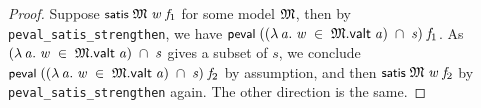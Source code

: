 \documentclass[letterpaper]{article}
\renewcommand{\HOLConst}[1]{{\textsf{\upshape\small #1}}}
\renewcommand{\HOLinline}[1]{\ensuremath{#1}}
\begin{document}
\begin{proof}
Suppose \HOLinline{\HOLConst{satis}\;\HOLFreeVar{\ensuremath{\mathfrak{M}}}\;\HOLFreeVar{w}\;\HOLFreeVar{f\sb{\mathrm{1}}}} for some model \HOLinline{\HOLFreeVar{\ensuremath{\mathfrak{M}}}}, then by \texttt{peval_satis_strengthen}, we have \HOLinline{\HOLConst{peval}\;((\HOLTokenLambda{}\HOLBoundVar{a}.\;\HOLFreeVar{w}\;\HOLSymConst{\HOLTokenIn{}}\;\HOLFreeVar{\ensuremath{\mathfrak{M}}}.\HOLFieldName{valt}\;\HOLBoundVar{a})\;\HOLSymConst{\HOLTokenInter{}}\;\HOLFreeVar{s})\;\HOLFreeVar{f\sb{\mathrm{1}}}}. As \HOLinline{(\HOLTokenLambda{}\HOLBoundVar{a}.\;\HOLFreeVar{w}\;\HOLSymConst{\HOLTokenIn{}}\;\HOLFreeVar{\ensuremath{\mathfrak{M}}}.\HOLFieldName{valt}\;\HOLBoundVar{a})\;\HOLSymConst{\HOLTokenInter{}}\;\HOLFreeVar{s}} gives a subset of $s$, we conclude \HOLinline{\HOLConst{peval}\;((\HOLTokenLambda{}\HOLBoundVar{a}.\;\HOLFreeVar{w}\;\HOLSymConst{\HOLTokenIn{}}\;\HOLFreeVar{\ensuremath{\mathfrak{M}}}.\HOLFieldName{valt}\;\HOLBoundVar{a})\;\HOLSymConst{\HOLTokenInter{}}\;\HOLFreeVar{s})\;\HOLFreeVar{f\sb{\mathrm{2}}}} by assumption, and then \HOLinline{\HOLConst{satis}\;\HOLFreeVar{\ensuremath{\mathfrak{M}}}\;\HOLFreeVar{w}\;\HOLFreeVar{f\sb{\mathrm{2}}}} by \texttt{peval_satis_strengthen} again. The other direction is the same.
\end{proof}
\end{document}
